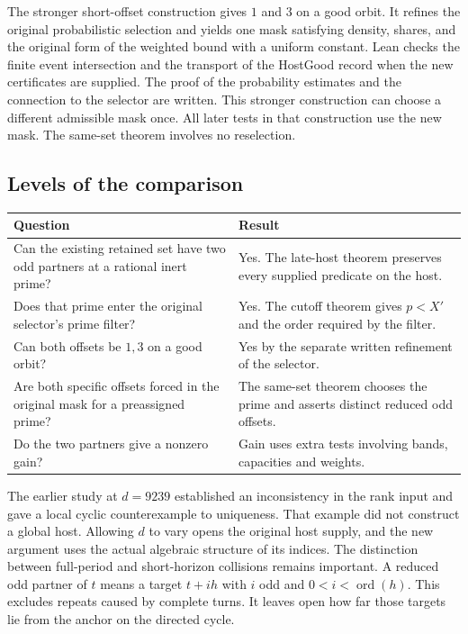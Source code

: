 \documentclass[12pt,letterpaper]{article}
\DeclareRobustCommand{\id}[1]{\mbox{\small\ttfamily #1}}
\begin{document}
The stronger short-offset construction gives \(1\) and \(3\) on a good orbit. It refines the original probabilistic selection and yields one mask satisfying density, shares, and the original form of the weighted bound with a uniform constant. Lean checks the finite event intersection and the transport of the \id{HostGood} record when the new certificates are supplied. The proof of the probability estimates and the connection to the selector are written. This stronger construction can choose a different admissible mask once. All later tests in that construction use the new mask. The same-set theorem involves no reselection.

\subsection{Levels of the comparison}

\begin{center}
\begin{tabularx}{\linewidth}{@{}p{.34\linewidth}Y@{}}
\toprule
Question & Result\\
\midrule
Can the existing retained set have two odd partners at a rational inert prime? & Yes. The late-host theorem preserves every supplied predicate on the host.\\
Does that prime enter the original selector's prime filter? & Yes. The cutoff theorem gives \(p<X'\) and the order required by the filter.\\
Can both offsets be \(1,3\) on a good orbit? & Yes by the separate written refinement of the selector.\\
Are both specific offsets forced in the original mask for a preassigned prime? & The same-set theorem chooses the prime and asserts distinct reduced odd offsets.\\
Do the two partners give a nonzero gain? & Gain uses extra tests involving bands, capacities and weights.\\
\bottomrule
\end{tabularx}
\end{center}

The earlier study at \(d=9239\) established an inconsistency in the rank input and gave a local cyclic counterexample to uniqueness. That example did not construct a global host. Allowing \(d\) to vary opens the original host supply, and the new argument uses the actual algebraic structure of its indices. The distinction between full-period and short-horizon collisions remains important. A reduced odd partner of \(t\) means a target \(t+ih\) with \(i\) odd and \(0<i<\operatorname{ord}(h)\). This excludes repeats caused by complete turns. It leaves open how far those targets lie from the anchor on the directed cycle.
\end{document}
